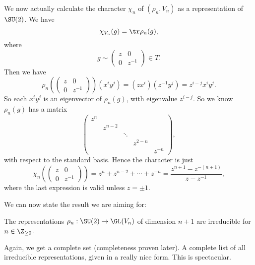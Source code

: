 \documentclass[a4paper]{article}
\begin{document}
We now actually calculate the character $\chi_n$ of $(\rho_n, V_n)$ as a representation of $\SU(2)$. We have
\[
  \chi_{V_n}(g) = \tr \rho_n (g),
\]
where
\[
  g \sim
  \begin{pmatrix}
    z & 0\\
    0 & z^{-1}
  \end{pmatrix} \in T.
\]
Then we have
\[
  \rho_n \left(
  \begin{pmatrix}
    z & 0\\
    0 & z^{-1}
  \end{pmatrix}\right)(x^i y^j) = (zx^i)(z^{-1}y^j) = z^{i - j} x^i y^j.
\]
So each $x^i y^j$ is an eigenvector of $\rho_n (g)$, with eigenvalue $z^{i - j}$. So we know $\rho_n (g)$ has a matrix
\[
  \begin{pmatrix}
    z^n\\
    & z^{n - 2}\\
    & & \ddots\\
    & & & z^{2 - n}\\
    & & & & z^{-n}
  \end{pmatrix},
\]
with respect to the standard basis. Hence the character is just
\[
  \chi_n\left(
  \begin{pmatrix}
    z & 0\\
    0 & z^{-1}
  \end{pmatrix}\right) = z^n + z^{n - 2} + \cdots + z^{-n} = \frac{z^{n + 1} - z^{-(n + 1)}}{z - z^{-1}},
\]
where the last expression is valid unless $z = \pm 1$.

We can now state the result we are aiming for:
\begin{thm}
  The representations $\rho_n : \SU(2) \to \GL(V_n)$ of dimension $n + 1$ are irreducible for $n \in \Z_{\geq 0}$.
\end{thm}
Again, we get a complete set (completeness proven later). A complete list of all irreducible representations, given in a really nice form. This is spectacular.
\end{document}
